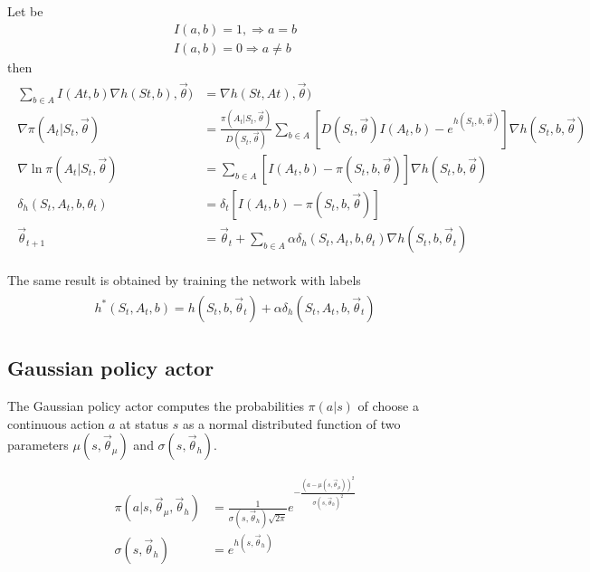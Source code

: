 \documentclass[]{article}
\begin{document}
Let be
\begin{align*}
	I(a, b) = 1, \Rightarrow a = b
	\\
	I(a,b) = 0 \Rightarrow a \ne b
\end{align*}
then
\begin{align*}
\begin{split}
	\sum_{b \in A} I(At, b) \nabla h(St, b), \vec \theta)
	&= \nabla h(St, At), \vec \theta)
	\\
	\nabla \pi(A_t|S_t, \vec \theta)
	&=
	\frac{\pi(A_t|S_t,\vec \theta)}{D(S_t,\vec \theta)}
	\sum_{b \in A}
	\left[
		D(S_t, \vec \theta) I(A_t,b)
		-  e^{h(S_t,b,\vec \theta)}
	\right] 	
	\nabla h(S_t,b,\vec \theta)
	\\
	\nabla \ln \pi(A_t|S_t, \vec \theta)
	&=
	\sum_{b \in A}
	\left[
		I(A_t,b)
		-  \pi(S_t,b,\vec \theta)
	\right] 	
	\nabla h(S_t,b,\vec \theta)
	\\
	\delta_h(S_t, A_t, b, \theta_t)
	&= \delta_t
	\left[
		I(A_t,b) - \pi(S_t,b,\vec \theta)
	\right] 
	\\
	\vec \theta_{t+1}
	&=
	\vec \theta_t +
	\sum_{b \in A}
	\alpha \delta_h(S_t, A_t, b, \theta_t)  \nabla h(S_t,b,\vec \theta_t)
\end{split}
\end{align*}

The same result is obtained by training the network with labels
\begin{align}
\begin{split}
	h^*(S_t,A_t,b) = h(S_t,b,\vec \theta_t) + 
	\alpha \delta_h(S_t, A_t, b, \vec \theta_t)
\end{split}
\end{align}

\subsection{Gaussian policy actor}

The Gaussian policy actor computes the probabilities $ \pi(a|s) $ of choose a continuous action $ a $ at status $ s $ as a normal distributed function of two parameters $ \mu(s, \vec \theta_\mu) $ and $ \sigma(s,\vec \theta_h) $.

\begin{align}
	\pi(a|s,\vec \theta_\mu, \vec \theta_h)
	&= \frac{1}{\sigma(s,\vec \theta_h) \sqrt{2 \pi}} e^{-\frac{(a - \mu(s, \vec \theta_\mu))^2}{\sigma(s, \vec \theta_h)^2}}
	\\
	\sigma(s, \vec \theta_h)
	&	= e^{h(s, \vec \theta_h)}	
\end{align}
\end{document}

